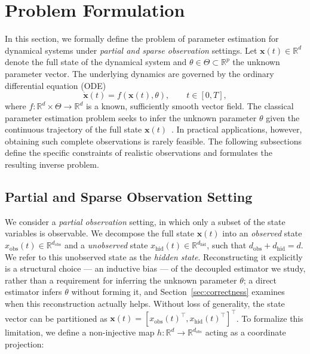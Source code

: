 \section{Problem Formulation}
\label{sec:problem}

In this section, we formally define the problem of parameter estimation for dynamical systems under \emph{partial and sparse observation} settings. 
Let $\mathbf{x}(t)\in\mathbb{R}^d$ denote the full state of the dynamical system and $\theta\in\Theta\subset\mathbb{R}^p$ the unknown parameter vector.
The underlying dynamics are governed by the ordinary differential equation (ODE)
\begin{equation}
\label{eq:ode}
    \dot{\mathbf{x}}(t)=f(\mathbf{x}(t),\theta),\qquad t\in[0,T],
\end{equation}
where $f:\mathbb{R}^d\times\Theta\to\mathbb{R}^d$ is a known, sufficiently smooth vector field.
The classical parameter estimation problem seeks to infer the unknown parameter $\theta$ given the continuous trajectory of the full state $\mathbf{x}(t)$~\cite{tarantola2005inverse}. 
In practical applications, however, obtaining such complete observations is rarely feasible.
The following subsections define the specific constraints of realistic observations and formulates the resulting inverse problem.

\subsection{Partial and Sparse Observation Setting}
\label{subsec:obsmodel}

We consider a \emph{partial observation} setting, in which only a subset of the state variables is observable.
We decompose the full state $\mathbf{x}(t)$ into an \emph{observed} state $x_{\mathrm{obs}}(t)\in\mathbb{R}^{d_{\mathrm{obs}}}$ and a
\emph{unobserved} state $x_{\mathrm{hid}}(t)\in\mathbb{R}^{d_{\mathrm{hid}}}$, such that $d_{\mathrm{obs}}+d_{\mathrm{hid}}=d$.
We refer to this unobserved state as the \emph{hidden state}. Reconstructing it explicitly is a structural choice --- an inductive bias --- of the decoupled estimator we study, rather than a requirement for inferring the unknown parameter $\theta$; a direct estimator infers $\theta$ without forming it, and Section~\ref{sec:correctness} examines when this reconstruction actually helps.
Without loss of generality, the state vector can be partitioned as $\mathbf{x}(t) = \left[x_\mathrm{obs}(t)^\top , x_\mathrm{hid}(t)^\top\right]^\top$.
To formalize this limitation, we define a non-injective map $h:\mathbb{R}^d \to \mathbb{R}^{d_{obs}}$ acting as a coordinate projection:

